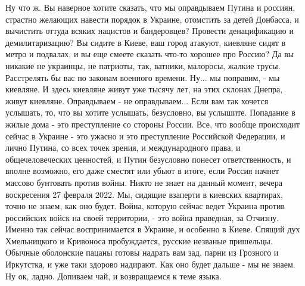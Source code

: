 Ну что ж. Вы наверное хотите сказать, что мы оправдываем Путина и россиян,
страстно желающих навести порядок в Украине, отомстить за детей Донбасса, и
вычистить оттуда всяких нацистов и бандеровцев? Провести денацификацию и
демилитаризацию? Вы сидите в Киеве, ваш город атакуют, киевляне сидят в метро и
подвалах, и вы еще смеете сказать что-то хорошее про Россию? Да вы никакие не
украинцы, не патриоты, так, ватники, малоросы, жалкие трусы. Расстрелять бы вас
по законам военного времени.  Ну...  мы поправим, - мы киевляне. И здесь
киевляне живут уже тысячу лет, на этих склонах Днепра, живут киевляне.
Оправдываем - не оправдываем... Если вам так хочется услышать, то, что вы
хотите услышать, безусловно, вы услышите. Попадание в жилые дома - это
преступление со стороны России.  Все, что вообще происходит сейчас в Украине -
это ужасно и это преступление Российской Федерации, и лично Путина, со всех
точек зрения, и международного права, и общечеловеческих ценностей, и Путин
безусловно понесет ответственность, и вполне возможно, его даже сместят или
убьют в итоге, если Россия начнет массово бунтовать против войны.  Никто не
знает на данный момент, вечера воскресения 27 февраля 2022. Мы, сидящие
взаперти в киевских квартирах, точно не знаем, как оно будет. Война, которую
сейчас ведет Украина против российских войск на своей территории, - это война
праведная, за Отчизну. Именно так сейчас воспринимается в Украине, и особенно в
Киеве. Спящий дух Хмельницкого и Кривоноса пробуждается, русские незваные
пришельцы. Обычные оболонские пацаны готовы надрать вам зад, парни из Грозного
и Иркутстка, и уже таки здорово надирают. Как оно будет дальше - мы не знаем.
Ну ок, ладно. Допиваем чай, и возвращаемся к теме языка.
